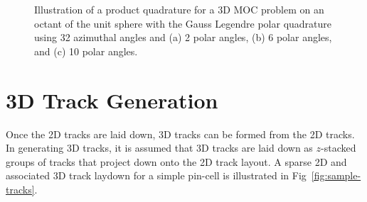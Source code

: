 \begin{figure}[h!]
\begin{subfigure}{0.3\textwidth}
		\caption{}
		\label{fig:quad-unit-sphere-c}
	\end{subfigure}
	\caption[]{Illustration of a product quadrature for a 3D MOC problem on an octant of the unit sphere with the Gauss Legendre polar quadrature using 32 azimuthal angles and (a) 2 polar angles, (b) 6 polar angles, and (c) 10 polar angles.}
	\label{fig:quad-unit-sphere}
\end{figure}


\section{3D Track Generation}
\label{sec:laydown-3D}

Once the 2D tracks are laid down, 3D tracks can be formed from the 2D tracks. In generating 3D tracks, it is assumed that 3D tracks are laid down as $z$-stacked groups of tracks that project down onto the 2D track layout. A sparse 2D and associated 3D track laydown for a simple pin-cell is illustrated in Fig~\ref{fig:sample-tracks}.

